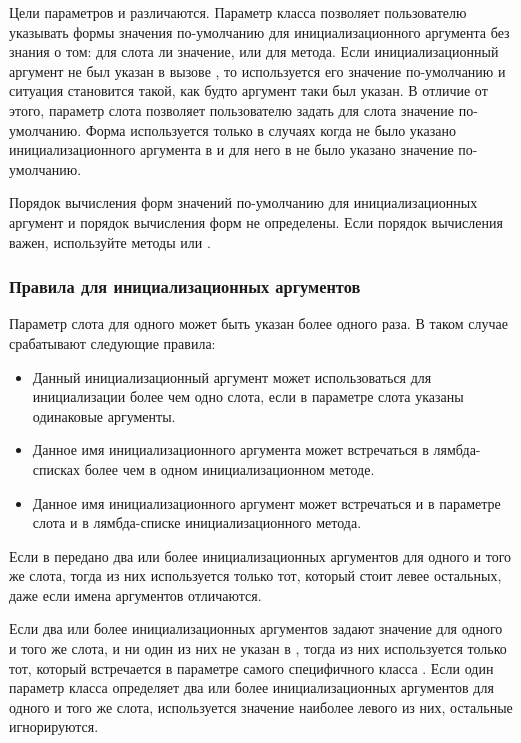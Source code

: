 Цели параметров  и  различаются. Параметр
класса  позволяет пользователю указывать
формы значения по-умолчанию для инициализационного аргумента без знания о том:
для слота ли значение, или для метода. Если инициализационный аргумент не был
указан в вызове , то используется его значение по-умолчанию и
ситуация становится такой, как будто аргумент таки был указан. В отличие от
этого, параметр слота  позволяет пользователю задать для слота
значение по-умолчанию. Форма  используется только в случаях когда
не было указано инициализационного аргумента в  и для
него в  не было указано значение по-умолчанию.

Порядок вычисления форм значений по-умолчанию для инициализационных аргумент и
порядок вычисления форм  не определены. Если порядок вычисления
важен, используйте методы  или .

\subsubsection{Правила для инициализационных аргументов}
\label{Rules-for-Initialization-Arguments-SECTION}

Параметр слота  для одного может быть указан более одного раза.
В таком случае срабатывают следующие правила:

\begin{itemize}
\item Данный инициализационный аргумент может использоваться для инициализации
  более чем одно слота, если в параметре слота  указаны одинаковые
  аргументы.

\item Данное имя инициализационного аргумента может встречаться в лямбда-списках
  более чем в одном инициализационном методе.

\item Данное имя инициализационного аргумент может встречаться и в параметре
  слота  и в лямбда-списке инициализационного метода.
\end{itemize}

Если в  передано два или более инициализационных аргументов
для одного и того же слота, тогда из них используется только тот, который стоит
левее остальных, даже если имена аргументов отличаются.

Если два или более инициализационных аргументов задают значение
для одного и того же слота, и ни один из них не указан в ,
тогда из них используется только тот, который встречается в параметре самого
специфичного класса . Если один параметр класса
 определяет два или более инициализационных аргументов для
одного и того же слота, используется значение наиболее левого из них, остальные
игнорируются.

